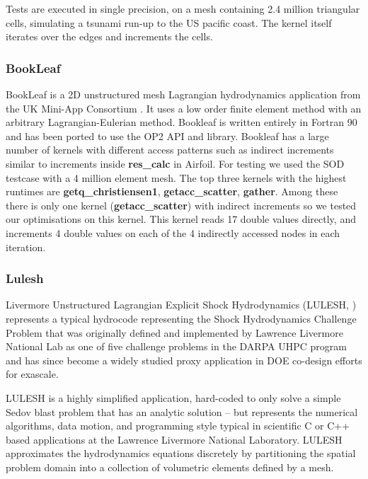 Tests are executed in single precision, on a mesh containing 2.4 million
triangular cells, simulating a tsunami run-up to the US pacific coast. The
kernel itself iterates over the edges and increments the cells.

\subsubsection{BookLeaf}
BookLeaf is a 2D unstructured mesh Lagrangian hydrodynamics application from the
UK Mini-App Consortium \cite{uk-mac}. It uses a low order finite element method
with an arbitrary Lagrangian-Eulerian method.  Bookleaf is written entirely in
Fortran 90 and has been ported to use the OP2 API and library. Bookleaf has a
large number of kernels with different access patterns such as indirect
increments similar to increments inside \textbf{res\_calc} in Airfoil. For
testing we used the SOD testcase with a 4 million element mesh. The top three
kernels with the highest runtimes are \textbf{getq\_christiensen1},
\textbf{getacc\_scatter}, \textbf{gather}. Among these there is only
one kernel (\textbf{getacc\_scatter}) with indirect increments so we tested our
optimisations on this kernel. This kernel reads 17 double values directly, and
increments 4 double values on each of the 4 indirectly accessed nodes in each
iteration.

\subsubsection{Lulesh}\label{sec:lulesh-summary}


Livermore Unstructured Lagrangian Explicit Shock Hydrodynamics (LULESH,
\cite{LULESH2:changes}) represents a typical hydrocode representing the Shock
Hydrodynamics Challenge Problem that was originally defined and implemented by
Lawrence Livermore National Lab as one of five challenge problems in the DARPA
UHPC program and has since become a widely studied proxy application in DOE
co-design efforts for exascale. 

LULESH is a highly simplified application, hard-coded to only solve a simple
Sedov blast problem that has an analytic solution \cite{LULESH:spec} – but
represents the numerical algorithms, data motion, and programming style typical
in scientific C or C++ based applications at the Lawrence Livermore National
Laboratory. LULESH approximates the hydrodynamics equations discretely by
partitioning the spatial problem domain into a collection of volumetric elements
defined by a mesh.

